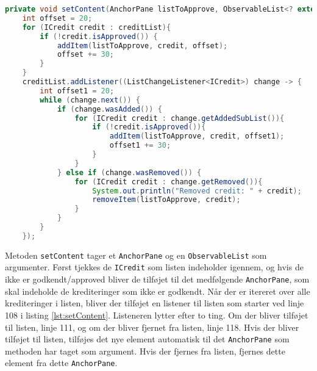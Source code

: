 \begin{lstlisting}[language=Java, firstnumber=100, label=lst:setContent, caption = Funktionen
setContet sætter listen og hvordan denne opdateres]
private void setContent(AnchorPane listToApprove, ObservableList<? extends ICredit> creditList){
    int offset = 20;
    for (ICredit credit : creditList){
        if (!credit.isApproved()) {
            addItem(listToApprove, credit, offset);
            offset += 30;
        }
    }
    creditList.addListener((ListChangeListener<ICredit>) change -> {
        int offset1 = 20;
        while (change.next()) {
            if (change.wasAdded()) {
                for (ICredit credit : change.getAddedSubList()){
                    if (!credit.isApproved()){
                        addItem(listToApprove, credit, offset1);
                        offset1 += 30;
                    }
                }
            } else if (change.wasRemoved()) {
                for (ICredit credit : change.getRemoved()){
                    System.out.println("Removed credit: " + credit);
                    removeItem(listToApprove, credit);
                }
            }
        }
    });
\end{lstlisting}

Metoden \texttt{setContent} tager et \texttt{AnchorPane} og en
\texttt{ObservableList} som argumenter. Først tjekkes de \texttt{ICredit} som
listen indeholder igennem, og hvis de ikke er godkendt/approved bliver de
tilføjet til det medfølgende \texttt{AnchorPane}, som skal indeholde de krediteringer som
ikke er godkendt. Når der er itereret over alle krediteringer i listen, bliver
der tilføjet en listener til listen som starter ved linje 108 i listing
\ref{lst:setContent}. Listeneren lytter efter to ting. Om der bliver tilføjet
til listen, linje 111, og om der bliver fjernet fra listen, linje 118. Hvis der
bliver tilføjet til listen, tilføjes det nye element automatisk til det
\texttt{AnchorPane} som methoden har taget som argument. Hvis der fjernes fra listen,
fjernes dette element fra dette \texttt{AnchorPane}.
